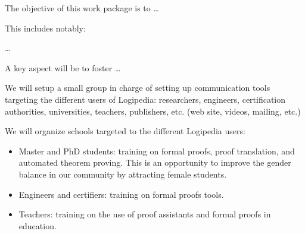 \begin{workpackage}[id=dissemination,wphases=0-48,type=MGT,
  short=Dissemination,%
  title={Dissemination, communication, and exploitation},
  lead=Inr,
  BolRM=3,
  InrRM=10]

\begin{wpobjectives}
  The objective of this work package is to \ldots

This includes notably:
  \begin{compactitem}
  \item \ldots
  \end{compactitem}
  A key aspect will be to foster \ldots
\end{wpobjectives}

\begin{wpdescription}
   
\end{wpdescription}

\begin{tasklist}
  \begin{task}[id=com,title=Communication]
    We will setup a small group in charge of setting up communication
    tools targeting the different users of Logipedia: researchers,
    engineers, certification authorities, universities, teachers,
    publishers, etc. (web site, videos, mailing, etc.)
  \end{task}

  \begin{task}[id=schools,title=Training Logipedia users]
    We will organize schools targeted to the different Logipedia users:
    \begin{itemize}
    \item Master and PhD students: training on formal proofs, proof
      translation, and automated theorem proving. This is an
      opportunity to improve the gender balance in our community by
      attracting female students.
    \item Engineers and certifiers: training on formal proofs tools.
    \item Teachers: training on the use of proof assistants and formal
      proofs in education.
    \end{itemize}
  \end{task}


\end{tasklist}
\end{workpackage}
